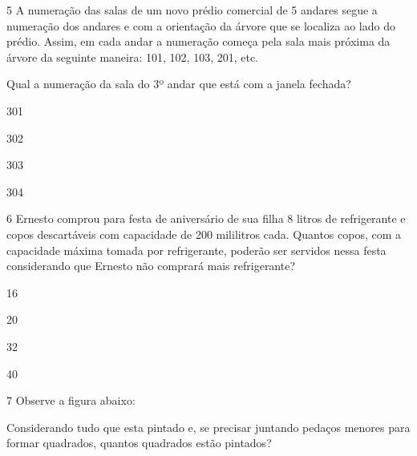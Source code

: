 \num{5} A numeração das salas de um novo prédio comercial de 5 andares
segue a numeração dos andares e com a orientação da árvore que se
localiza ao lado do prédio. Assim, em cada andar a numeração começa pela
sala mais próxima da árvore da seguinte maneira: 101, 102, 103, 201,
etc.


Qual a numeração da sala do 3º andar que está com a janela fechada?

\begin{escolha}
\item
  301
\item
  302
\item
  303
\item
  304
\end{escolha}


\num{6} Ernesto comprou para festa de aniversário de sua filha 8 litros de
refrigerante e copos descartáveis com capacidade de 200 mililitros cada.
Quantos copos, com a capacidade máxima tomada por refrigerante, poderão
ser servidos nessa festa considerando que Ernesto não comprará mais
refrigerante?

\begin{escolha}
\item
  16
\item
  20
\item
  32
\item
  40
\end{escolha}


\num{7} Observe a figura abaixo:


Considerando tudo que esta pintado e, se precisar juntando pedaços
menores para formar quadrados, quantos quadrados estão pintados?

